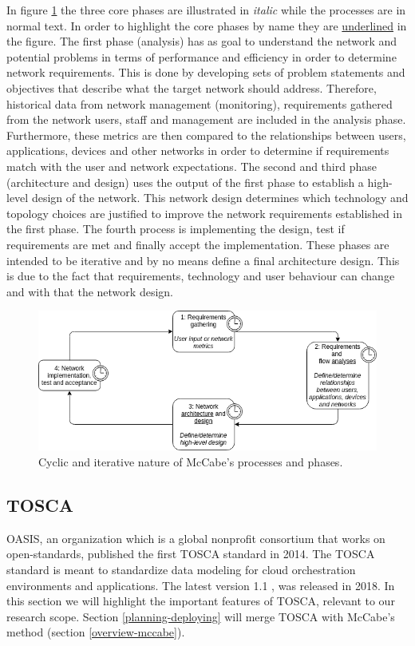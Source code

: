 In figure \ref{fig:mccabe-process} the three core phases are illustrated in \textit{italic} while the processes are in normal text. In order to highlight the core phases by name they are \underline{underlined} in the figure. The first phase (analysis) has as goal to understand the network and potential problems in terms of performance and efficiency in order to determine network requirements. This is done by developing sets of problem statements and objectives that describe what the target network should address. Therefore, historical data from network management (monitoring), requirements gathered from the network users, staff and management are included in the analysis phase. Furthermore, these metrics are then compared to the relationships between users, applications, devices and other networks in order to determine if requirements match with the user and network expectations. The second and third phase (architecture and design) uses the output of the first phase to establish a high-level design of the network. This network design determines which technology and topology choices are justified to improve the network requirements established in the first phase. The fourth process is implementing the design, test if requirements are met and finally accept the implementation. These phases are intended to be iterative and by no means define a final architecture design. This is due to the fact that requirements, technology and user behaviour can change and with that the network design.

\begin{figure}[H]
\centering
\includegraphics[width=\columnwidth]{Images/mccabe-process.png}
\caption{Cyclic and iterative nature of McCabe's processes and phases.}
\label{fig:mccabe-process}
\end{figure}

\subsection{TOSCA}
\label{overview-tosca}
OASIS, an organization which is a global nonprofit consortium that works on open-standards, published the first TOSCA standard in 2014. The TOSCA standard is meant to standardize data modeling for cloud orchestration environments and applications. The latest version 1.1 \cite{tosca-standard}, was released in 2018. In this section we will highlight the important features of TOSCA, relevant to our research scope. Section \ref{planning-deploying} will merge TOSCA with McCabe's method (section \ref{overview-mccabe}).

